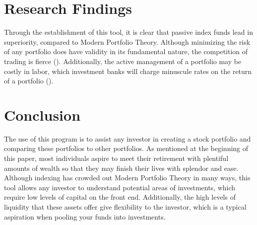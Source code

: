 \documentclass[12pt,english]{article}
\begin{document}
\begin{doublespace}
    \section{Research Findings}\label{sec:results}\indent{}\indent{} %
    
        Through the establishment of this tool, it is clear that passive index funds lead in superiority, compared to Modern Portfolio Theory. Although minimizing the risk of any portfolio does have validity in its fundamental nature, the competition of trading is fierce (\citet{Zucker2020}). Additionally, the active management of a portfolio may be costly in labor, which investment banks will charge minuscule rates on the return of a portfolio (\citet{Zucker2020}).
    
    \section{Conclusion}\label{sec:conclusion}\indent{}\indent{} %
        The use of this program is to assist any investor in creating a stock portfolio and comparing these portfolios to other portfolios. As mentioned at the beginning of this paper, most individuals aspire to meet their retirement with plentiful amounts of wealth so that they may finish their lives with splendor and ease. Although indexing has crowded out Modern Portfolio Theory in many ways, this tool allows any investor to understand potential areas of investments, which require low levels of capital on the front end. Additionally, the high levels of liquidity that these assets offer give flexibility to the investor, which is a typical aspiration when pooling your funds into investments.
    
        \end{doublespace}
    
    
        \vfill
        \pagebreak{}
        \begin{spacing}{1.0}
        
        
        \end{spacing}
        
        \vfill
        \pagebreak{}
        \clearpage
    
\end{document}
